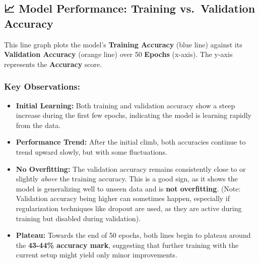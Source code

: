 \documentclass[
  letterpaper,
  DIV=11,
  numbers=noendperiod]{scrartcl}
\providecommand{\tightlist}{%
  \setlength{\itemsep}{0pt}\setlength{\parskip}{0pt}}
\begin{document}
\subsection{📈 Model Performance: Training vs.~Validation
Accuracy}\label{model-performance-training-vs.-validation-accuracy}

This line graph plots the model's \textbf{Training Accuracy} (blue line)
against its \textbf{Validation Accuracy} (orange line) over 50
\textbf{Epochs} (x-axis). The y-axis represents the \textbf{Accuracy}
score.

\subsubsection{Key Observations:}\label{key-observations}

\begin{itemize}
\tightlist
\item
  \textbf{Initial Learning:} Both training and validation accuracy show
  a steep increase during the first few epochs, indicating the model is
  learning rapidly from the data.
\item
  \textbf{Performance Trend:} After the initial climb, both accuracies
  continue to trend upward slowly, but with some fluctuations.
\item
  \textbf{No Overfitting:} The validation accuracy remains consistently
  close to or slightly \emph{above} the training accuracy. This is a
  good sign, as it shows the model is generalizing well to unseen data
  and is \textbf{not overfitting}. (Note: Validation accuracy being
  higher can sometimes happen, especially if regularization techniques
  like dropout are used, as they are active during training but disabled
  during validation).
\item
  \textbf{Plateau:} Towards the end of 50 epochs, both lines begin to
  plateau around the \textbf{43-44\% accuracy mark}, suggesting that
  further training with the current setup might yield only minor
  improvements.
\end{itemize}
\end{document}
